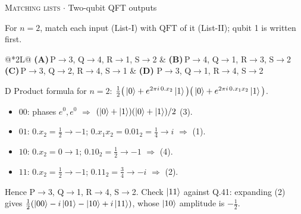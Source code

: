 \documentclass[11pt,a4paper]{article}
\newcommand{\optlabel}[1]{\textbf{(#1)}}
\newcommand{\correctlabel}[1]{\textcolor{okgreen}{\textbf{(#1)}\,\ding{51}}}
\newenvironment{qitem}[1]{\begin{list}{}{\setlength{\leftmargin}{3.3em}\setlength{\labelwidth}{3.1em}%
  \setlength{\labelsep}{0.2em}\setlength{\topsep}{3pt}\setlength{\parsep}{3pt}}\item[\textbf{Q.#1}\hfill]}{\end{list}}
\newcommand{\qsep}{\par\vspace{2pt}{\color{black!15}\hrule}\vspace{4pt}}
\newcommand{\qmeta}[2]{{\footnotesize\color{black!60}\textsc{#1} \;$\cdot$\; #2}\par}
\begin{document}
\begin{qitem}{56}
\qmeta{Matching lists}{Two-qubit QFT outputs}
For $n = 2$, match each input (List-I) with $\mathrm{QFT}$ of it (List-II); qubit 1 is written first.
\par\smallskip{}
\par\smallskip\noindent\begin{tabularx}{\linewidth}{@{}*{2}{L}@{}}
\optlabel{A}\,P$\to$3, Q$\to$4, R$\to$1, S$\to$2 & \optlabel{B}\,P$\to$4, Q$\to$1, R$\to$3, S$\to$2 \\[3pt]
\optlabel{C}\,P$\to$3, Q$\to$2, R$\to$4, S$\to$1 & \correctlabel{D}\,P$\to$3, Q$\to$1, R$\to$4, S$\to$2
\end{tabularx}
\end{qitem}
\begin{solbox}{D}
Product formula for $n = 2$: $\frac12\big(\ket0 + e^{2\pi i\,0.x_2}\ket1\big)\big(\ket0 + e^{2\pi i\,0.x_1x_2}\ket1\big)$.
\begin{itemize}\itemsep0pt
\item $00$: phases $e^0, e^0$ $\Rightarrow$ $(\ket0 + \ket1)(\ket0 + \ket1)/2$ (3).
\item $01$: $0.x_2 = \frac12 \to -1$; $0.x_1x_2 = 0.01_2 = \frac14 \to i$ $\Rightarrow$ (1).
\item $10$: $0.x_2 = 0 \to 1$; $0.10_2 = \frac12 \to -1$ $\Rightarrow$ (4).
\item $11$: $0.x_2 = \frac12 \to -1$; $0.11_2 = \frac34 \to -i$ $\Rightarrow$ (2).
\end{itemize}
Hence P$\to$3, Q$\to$1, R$\to$4, S$\to$2. Check $\ket{11}$ against Q.41: expanding (2) gives $\frac12(\ket{00} - i\ket{01} - \ket{10} + i\ket{11})$,
whose $\ket{10}$ amplitude is $-\frac12$.
\end{solbox}
\qsep
\end{document}
